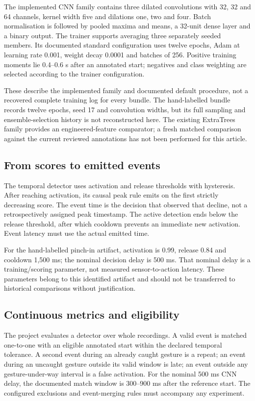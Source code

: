 The implemented CNN family contains three dilated convolutions with 32, 32 and 64 channels, kernel width five and dilations one, two and four. Batch normalisation is followed by pooled maxima and means, a 32-unit dense layer and a binary output. The trainer supports averaging three separately seeded members. Its documented standard configuration uses twelve epochs, Adam at learning rate 0.001, weight decay 0.0001 and batches of 256. Positive training moments lie 0.4--0.6 s after an annotated start; negatives and class weighting are selected according to the trainer configuration.

These describe the implemented family and documented default procedure, not a recovered complete training log for every bundle. The hand-labelled bundle records twelve epochs, seed 17 and convolution widths, but its full sampling and ensemble-selection history is not reconstructed here. The existing ExtraTrees family provides an engineered-feature comparator; a fresh matched comparison against the current reviewed annotations has not been performed for this article.

\subsection{From scores to emitted events}\label{from-scores-to-emitted-events}

The temporal detector uses activation and release thresholds with hysteresis. After reaching activation, its causal peak rule emits on the first strictly decreasing score. The event time is the decision that observed that decline, not a retrospectively assigned peak timestamp. The active detection ends below the release threshold, after which cooldown prevents an immediate new activation. Event latency must use the actual emitted time.

For the hand-labelled pinch-in artifact, activation is 0.99, release 0.84 and cooldown 1,500 ms; the nominal decision delay is 500 ms. That nominal delay is a training/scoring parameter, not measured sensor-to-action latency. These parameters belong to this identified artifact and should not be transferred to historical comparisons without justification.

\subsection{Continuous metrics and eligibility}\label{continuous-metrics-and-eligibility}

The project evaluates a detector over whole recordings. A valid event is matched one-to-one with an eligible annotated start within the declared temporal tolerance. A second event during an already caught gesture is a repeat; an event during an uncaught gesture outside its valid window is late; an event outside any gesture-under-way interval is a false activation. For the nominal 500 ms CNN delay, the documented match window is 300--900 ms after the reference start. The configured exclusions and event-merging rules must accompany any experiment.

